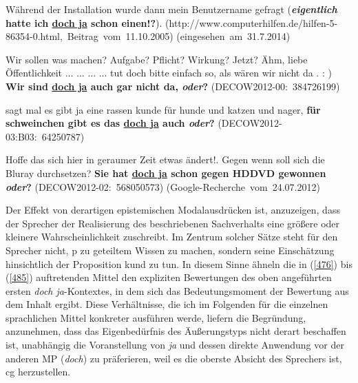 \begin{exe}
	\ex\label{482} 
	\scriptsize
	Während der Installation wurde dann mein Benutzername gefragt (\textbf{\textit{eigentlich} hatte ich \underline{doch ja} schon einen!?}).
	\hfill\hbox{(http://www.computerhilfen.de/hilfen-5-86354-0.html, Beitrag vom 11.10.2005)}	
	\newline		
	\hbox{}\hfill\hbox{(eingesehen am 31.7.2014)}	
\end{exe} 		
	
\begin{exe}
	\ex\label{483} 
	\scriptsize
	Wir sollen was machen? Aufgabe? Pflicht? Wirkung? Jetzt? Ähm, liebe Öffentlichkeit ... ... ... ... tut doch bitte einfach so, als wären wir nicht da . 	: ) \textbf{Wir sind \underline{doch ja} auch gar nicht da, \textit{oder}?}
	\newline		
	\hbox{}\hfill\hbox{(DECOW2012-00: 384726199)}	
\end{exe} 		
				        		                        
\begin{exe}
	\ex\label{484} 
	\scriptsize
	sagt mal es gibt ja eine rassen kunde für hunde und katzen und nager, \textbf{für schweinchen gibt es das \underline{doch ja} auch \textit{oder}?}
	\hfill\hbox{(DECOW2012-03:B03: 64250787)}	
\end{exe} 									                        
 
\begin{exe}
	\ex\label{485} 
	\scriptsize
	Hoffe das sich hier in geraumer Zeit etwas ändert!. Gegen wenn soll sich die Bluray durchsetzen? \textbf{Sie hat \underline{doch ja} schon gegen HDDVD 	gewonnen \textit{oder}?}    
	\hfill\hbox{(DECOW2012-02: 568050573)}	
	\newline		
	\hbox{}\hfill\hbox{(Google-Recherche vom 24.07.2012)}	
	\newline		
	\hbox{}\hfill\hbox{\citet[228]{Mueller2017b}}	
\end{exe} 									   		                 
Der Effekt von derartigen epistemischen Modalausdrücken ist, anzuzeigen, dass der Sprecher der Realisierung des beschriebenen Sachverhalts eine größere oder kleinere Wahrscheinlichkeit zuschreibt. Im Zentrum solcher Sätze steht für den Sprecher nicht, p zu geteiltem Wissen zu machen, sondern seine Einschätzung hinsichtlich der Proposition kund zu tun. In diesem Sinne ähneln die in (\ref{476}) bis (\ref{485}) auftretenden Mittel den expliziten Bewertungen des oben angeführten ersten \textit{doch ja}-Kontextes, in dem sich das Bedeutungsmoment der Bewertung aus dem Inhalt ergibt. Diese Verhältnisse, die ich im Folgenden für die einzelnen sprachlichen Mittel konkreter ausführen werde, liefern die Begründung, anzunehmen, dass das Eigenbedürfnis des Äußerungstyps nicht derart beschaffen ist, unabhängig die Voranstellung von \textit{ja} und dessen direkte Anwendung vor der anderen MP (\textit{doch}) zu präferieren, weil es die oberste Absicht des Sprechers ist, cg herzustellen.

